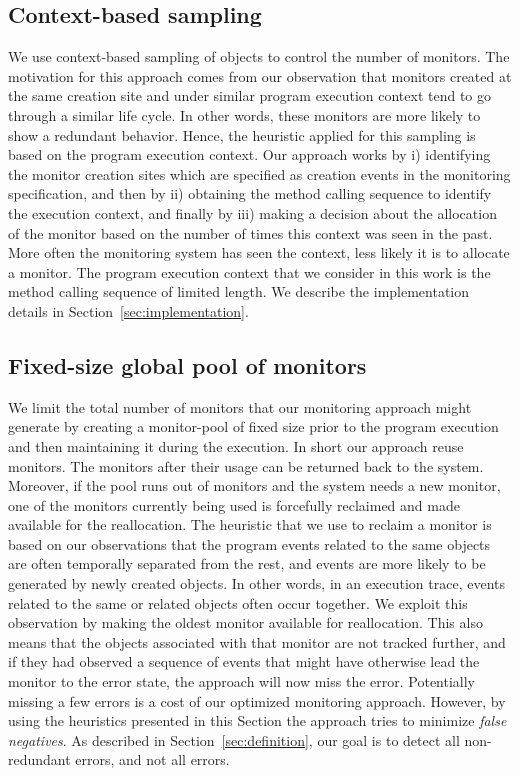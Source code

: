 \subsection{Context-based sampling}

We use context-based sampling of objects to control the 
number of monitors. The motivation for this approach comes from our observation 
that monitors created at the same creation site and under similar program
execution context tend to go through a similar life cycle. In other words, these monitors are more 
likely to show a redundant behavior. Hence, the heuristic applied for this 
sampling is based on the program execution context. Our approach works by i) identifying 
the monitor creation sites which are specified as creation events in the 
monitoring specification, and then by ii) obtaining the method calling sequence to identify 
the execution context, and finally by iii) making a decision about the 
allocation of the monitor based on the number of times this context was seen in 
the past. More often the monitoring system has seen the context, less likely it 
is to allocate a monitor. The program execution context that we consider in this work is
the method calling sequence of limited length. We describe the implementation details
in Section~\ref{sec:implementation}.

\subsection{Fixed-size global pool of monitors}

We limit the total number of monitors that our monitoring approach might generate by creating a 
monitor-pool of fixed size prior to the program execution and then maintaining 
it during the execution. In short our approach reuse monitors. The monitors 
after their usage can be returned back to the system. Moreover, if the pool runs 
out of monitors and the system needs a new monitor, one of the monitors currently being 
used is forcefully reclaimed and made available for the reallocation. The 
heuristic that we use to reclaim a monitor is based on our observations that the 
program events related to the same objects are often temporally separated from the rest,
and events are more likely to be generated by newly created objects. In other words, in an execution 
trace, events related to the same or related objects often occur together.
We exploit this observation by making the oldest
monitor available for reallocation. This also means that the objects associated with that monitor
are not tracked further, and if they had observed a sequence of events that might have otherwise
lead the monitor to the error state, the approach will now miss the error. 
Potentially missing a few errors is a cost of our optimized monitoring approach.
However, by using the heuristics presented in this Section the approach tries to
minimize \textit{false negatives}. As described in Section~\ref{sec:definition}, our
goal is to detect all non-redundant errors, and not all errors.

